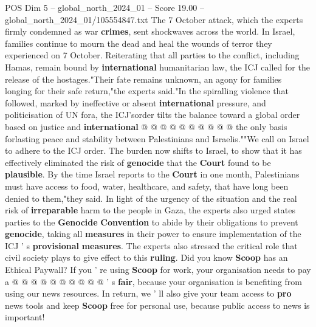 \begin{textsample}{POS Dim 5 – global\_north\_2024\_01 – Score 19.00 – global\_north\_2024\_01/105554847.txt}
The 7 October attack, which the experts firmly condemned as war \textbf{crimes}, sent shockwaves across the world.
In Israel, families continue to mourn the dead and heal the wounds of terror they experienced on 7 October.
Reiterating that all parties to the conflict, including Hamas, remain bound by \textbf{international} humanitarian law, the ICJ called for the release of the hostages."Their fate remains unknown, an agony for families longing for their safe return,"the experts said."In the spiralling violence that followed, marked by ineffective or absent \textbf{international} pressure, and politicisation of UN fora, the ICJ'sorder tilts the balance toward a global order based on justice and \textbf{international} @ @ @ @ @ @ @ @ @ @ the only basis forlasting peace and stability between Palestinians and Israelis.""We call on Israel to adhere to the ICJ order.
The burden now shifts to Israel, to show that it has effectively eliminated the risk of \textbf{genocide} that the \textbf{Court} found to be \textbf{plausible}.
By the time Israel reports to the \textbf{Court} in one month, Palestinians must have access to food, water, healthcare, and safety, that have long been denied to them,"they said.
In light of the urgency of the situation and the real risk of \textbf{irreparable} harm to the people in Gaza, the experts also urged states parties to the \textbf{Genocide} \textbf{Convention} to abide by their obligations to prevent \textbf{genocide}, taking all \textbf{measures} in their power to ensure implementation of the ICJ ' s \textbf{provisional} \textbf{measures}.
The experts also stressed the critical role that civil society plays to give effect to this \textbf{ruling}.
Did you know \textbf{Scoop} has an Ethical Paywall?
If you ' re using \textbf{Scoop} for work, your organisation needs to pay a @ @ @ @ @ @ @ @ @ @ ' s \textbf{fair}, because your organisation is benefiting from using our news resources.
In return, we ' ll also give your team access to \textbf{pro} news tools and keep \textbf{Scoop} free for personal use, because public access to news is important!

\end{textsample}
